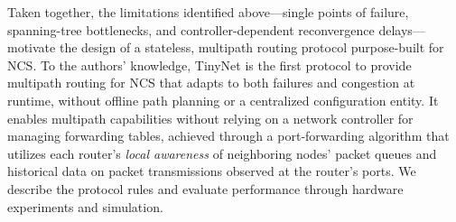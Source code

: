 Taken together, the limitations identified above---single points of failure, spanning-tree bottlenecks, and controller-dependent reconvergence delays---motivate the design of a stateless, multipath routing protocol purpose-built for NCS. To the authors' knowledge, TinyNet is the first protocol to provide multipath routing for NCS that adapts to both failures and congestion at runtime, without offline path planning or a centralized configuration entity. It enables multipath capabilities without relying on a network controller for managing forwarding tables, achieved through a port-forwarding algorithm that utilizes each router's \textit{local awareness} of neighboring nodes' packet queues and historical data on packet transmissions observed at the router's ports. We describe the protocol rules and evaluate performance through hardware experiments and simulation.